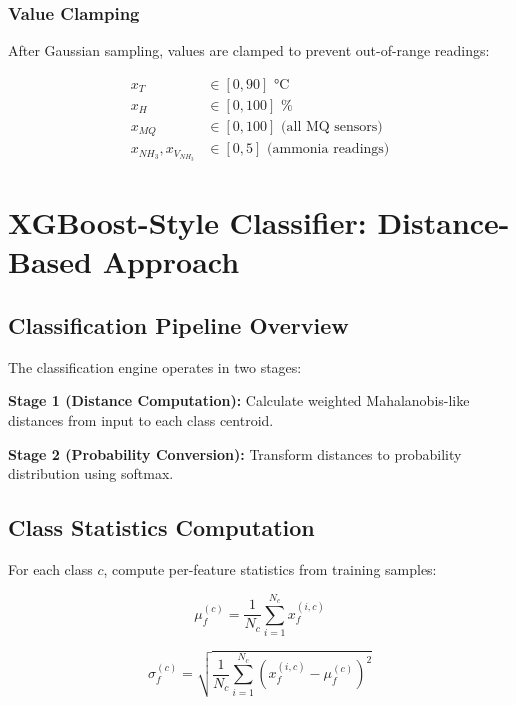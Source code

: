 \documentclass[10pt]{article}
\begin{document}
\subsubsection{Value Clamping}

After Gaussian sampling, values are clamped to prevent out-of-range readings:

\begin{align}
x_T &\in [0, 90] \text{ °C} \\
x_H &\in [0, 100] \text{ \%} \\
x_{MQ} &\in [0, 100] \text{ (all MQ sensors)} \\
x_{NH_3}, x_{V_{NH_3}} &\in [0, 5] \text{ (ammonia readings)}
\end{align}


\section{XGBoost-Style Classifier: Distance-Based Approach}

\subsection{Classification Pipeline Overview}

The classification engine operates in two stages:

\textbf{Stage 1 (Distance Computation):} Calculate weighted Mahalanobis-like distances from input to each class centroid.

\textbf{Stage 2 (Probability Conversion):} Transform distances to probability distribution using softmax.

\subsection{Class Statistics Computation}

For each class $c$, compute per-feature statistics from training samples:

\begin{equation}
\mu_f^{(c)} = \frac{1}{N_c} \sum_{i=1}^{N_c} x_f^{(i,c)}
\end{equation}

\begin{equation}
\sigma_f^{(c)} = \sqrt{\frac{1}{N_c} \sum_{i=1}^{N_c} (x_f^{(i,c)} - \mu_f^{(c)})^2}
\end{equation}
\end{document}

